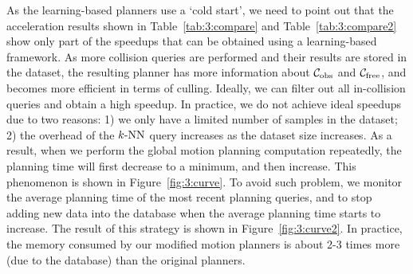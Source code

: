 As the learning-based planners use a `cold start', we need to point out that the acceleration results shown in Table~\ref{tab:3:compare} and Table~\ref{tab:3:compare2} show only part of the speedups that can be obtained using a learning-based framework. As more collision queries are performed and their results are stored in the dataset, the resulting planner has more information about $\mathcal C_{\text{obs}}$ and $\mathcal C_{\text{free}}$, and becomes more efficient in terms of culling. Ideally, we can filter out all in-collision queries and obtain a high speedup. In practice, we do not achieve ideal speedups due to two reasons: 1) we only have a limited number of samples in the dataset; 2) the overhead of the $k\text{-NN}$ query increases as the dataset size increases. As a result, when we perform the global motion planning computation repeatedly, the planning time will first decrease to a minimum, and then increase. This phenomenon is shown in Figure~\ref{fig:3:curve}. To avoid such problem, we monitor the average planning time of the most recent planning queries, and to stop adding new data into the database when the average planning time starts to increase. The result of this strategy is shown in Figure~\ref{fig:3:curve2}. In practice, the memory consumed by our modified motion planners is about 2-3 times more (due to the database) than the original planners.

